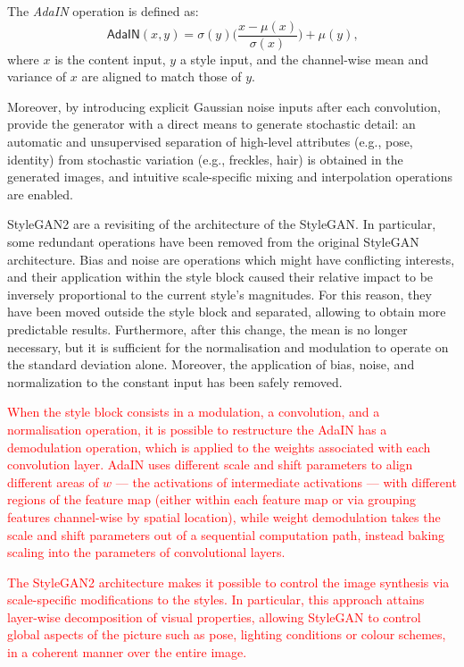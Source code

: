\documentclass{article}
\begin{document}
	The \textit{AdaIN} operation is defined as:
	\begin{equation}
		\label{e:adain}
		\mathsf{AdaIN}(x, y) = \sigma(y) \bigg(\frac{x - \mu(x)}{\sigma (x)} \bigg) + \mu (y) \mbox{,}
	\end{equation}
	where $x$ is the content input, $y$ a style input, and the channel-wise mean and variance of $x$ 
	are aligned to match those of $y$.

	Moreover, by introducing explicit Gaussian noise inputs after each convolution, 
	\citet{karras2019style} provide the generator with a direct means to generate stochastic detail: an 
	automatic and unsupervised separation of high-level attributes (e.g., pose, identity) from stochastic 
	variation (e.g., freckles, hair) is obtained in the generated images, and intuitive scale-specific mixing 
	and interpolation operations are enabled.
	
	StyleGAN2 \cite{karras2020analyzing} are a revisiting of the architecture of the StyleGAN. 
	In particular, some redundant operations have been removed from the original StyleGAN architecture.
	Bias and noise are operations which might have conflicting interests, and their application within the 
	style block caused their relative impact to be inversely proportional to the current style’s 
	magnitudes. For this reason, they have been moved outside the style block and separated, allowing 
	to obtain more predictable results.
	Furthermore, after this change, the mean is no longer necessary, but it is sufficient for the 
	normalisation and modulation to operate on the standard deviation alone.
	Moreover, the application of bias, noise, and normalization to the constant input has been safely 
	removed. 
	
	\textcolor{red}{
	When the style block consists in a modulation, a convolution, and a normalisation operation, it is 
	possible to restructure the AdaIN has a demodulation operation, which is applied to the weights 
	associated with each convolution layer. 
	AdaIN uses different scale and shift parameters to align different areas of $w$ — the activations of 
	intermediate activations — with different regions of the feature map (either within each feature map 
	or via grouping features channel-wise by spatial location), while weight demodulation takes the scale 
	and shift parameters out of a sequential computation path, instead baking scaling into the 
	parameters of convolutional layers.}
	
	\textcolor{red}{
	The StyleGAN2 architecture makes it possible to control the image synthesis via scale-specific 
	modifications to the styles. In particular, this approach attains layer-wise decomposition of visual 
	properties, allowing StyleGAN to control global aspects of the picture such as pose, lighting 
	conditions or colour schemes, in a coherent manner over the entire image.}
	
\end{document}
